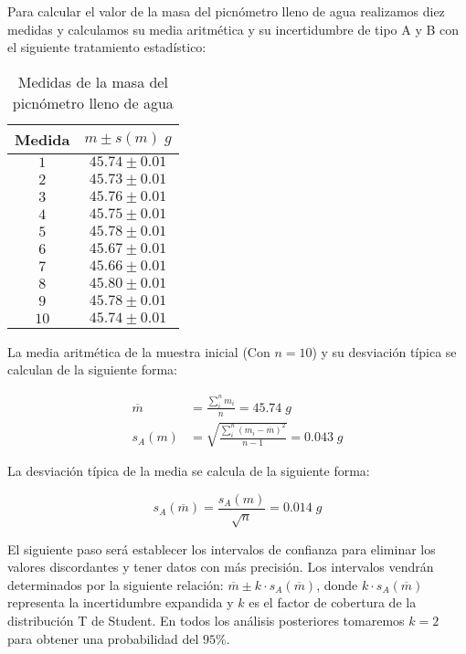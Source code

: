 \documentclass[a4paper,12pt,titlepage]{article}
\begin{document}
\par Para calcular el valor de la masa del picnómetro lleno de agua realizamos diez medidas y calculamos su media aritmética y su incertidumbre de tipo A y B con el siguiente tratamiento estadístico:

\begin{table}[h!]
    \centering
    \begin{tabular}{|c|c|}
    \hline
    Medida & $m \pm s(m)\; g$  \\ \hline
    $1$    & $45.74 \pm 0.01$ \\ \hline
    $2$    & $45.73 \pm 0.01$ \\ \hline
    $3$    & $45.76 \pm 0.01$ \\ \hline
    $4$    & $45.75 \pm 0.01$ \\ \hline
    $5$    & $45.78 \pm 0.01$ \\ \hline
    $6$    & $45.67 \pm 0.01$ \\ \hline
    $7$    & $45.66 \pm 0.01$ \\ \hline
    $8$    & $45.80 \pm 0.01$ \\ \hline
    $9$    & $45.78 \pm 0.01$ \\ \hline
    $10$   & $45.74 \pm 0.01$ \\ \hline
    \end{tabular}
    \caption{Medidas de la masa del picnómetro lleno de agua}
    \label{Pic Agua}
    \end{table}

La media aritmética de la muestra inicial (Con $n=10$) y su desviación típica se calculan de la siguiente forma:

\begin{align}
    \overline{m} &= \frac{\sum_{i}^n m_{i}}{n} = 45.74 \; g 
    \label{Media1} \\
    s_{A}(m) &= \sqrt{\frac{\sum_{i}^n (m_i-\overline{m})^2}{n-1}} = 0.043 \; g
    \label{Desviación Típica de la muestra}
\end{align}

La desviación típica de la media se calcula de la siguiente forma:

\begin{equation}
    s_{A}(\overline{m}) = \frac{s_{A}(m)}{\sqrt{n}} = 0.014 \; g
    \label{Desv_T_agua}
\end{equation}


El siguiente paso será establecer los intervalos de confianza para eliminar los valores discordantes y tener datos con más precisión. Los intervalos vendrán determinados por la siguiente relación: $\overline{m} \pm k \cdot s_{A}(\overline{m})$, donde $k \cdot s_{A}(\overline{m})$ representa la incertidumbre expandida y $k$ es el factor de cobertura de la distribución T de Student. En todos los análisis posteriores tomaremos $k=2$ para obtener una probabilidad del $95 \%$.
\end{document}
